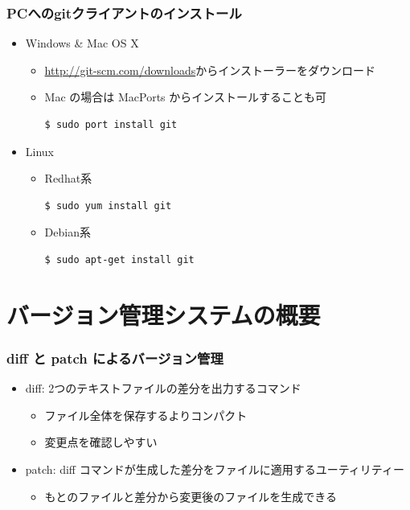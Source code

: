 \begin{frame}[t,fragile]
  \frametitle{PCへのgitクライアントのインストール}
  \begin{itemize}
  \item Windows \& Mac OS X
    \begin{itemize}
      \item \url{http://git-scm.com/downloads}からインストーラーをダウンロード
      \item Mac の場合は MacPorts からインストールすることも可
\begin{lstlisting}
$ sudo port install git
\end{lstlisting}
    \end{itemize}
  \item Linux
    \begin{itemize}
      \item Redhat系
\begin{lstlisting}
$ sudo yum install git
\end{lstlisting}
      \item Debian系
\begin{lstlisting}
$ sudo apt-get install git
\end{lstlisting}
    \end{itemize}
  \end{itemize}
\end{frame}

\section{バージョン管理システムの概要}

\begin{frame}
  \frametitle{diff と patch によるバージョン管理}
  \begin{itemize}
    \setlength{\itemsep}{1em}
  \item diff: 2つのテキストファイルの差分を出力するコマンド
    \begin{itemize}
    \item ファイル全体を保存するよりコンパクト
    \item 変更点を確認しやすい
    \end{itemize}
  \item patch: diff コマンドが生成した差分をファイルに適用するユーティリティー
    \begin{itemize}
    \item もとのファイルと差分から変更後のファイルを生成できる
    \end{itemize}
  \end{itemize}
\end{frame}


